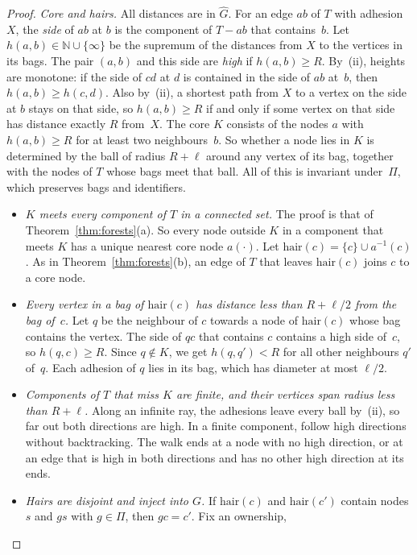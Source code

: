 \documentclass[11pt]{article}
\theoremstyle{remark}
\begin{document}
\begin{proof}
\emph{Core and hairs.} All distances are in $\hat G$. For an edge $ab$ of $T$ with adhesion $X$, the
\emph{side} of $ab$ at $b$ is the component of $T-ab$ that contains~$b$. Let $h(a,b)\in\mathbb
N\cup\{\infty\}$ be the supremum of the distances from $X$ to the vertices in its bags. The pair
$(a,b)$ and this side are \emph{high} if $h(a,b)\ge R$. By~(ii), heights are monotone: if the side of
$cd$ at $d$ is contained in the side of $ab$ at~$b$, then $h(a,b)\ge h(c,d)$. Also by~(ii), a shortest
path from $X$ to a vertex on the side at $b$ stays on that side, so $h(a,b)\ge R$ if and only if some
vertex on that side has distance exactly $R$ from~$X$. The core $K$ consists of the nodes $a$ with
$h(a,b)\ge R$ for at least two neighbours~$b$. So whether a node lies in $K$ is determined by the ball
of radius $R+\ell$ around any vertex of its bag, together with the nodes of $T$ whose bags meet that
ball. All of this is invariant under~$\Pi$, which preserves bags and identifiers.
\begin{itemize}
\item[(a)] \emph{$K$ meets every component of $T$ in a connected set.} The proof is that of
  Theorem~\ref{thm:forests}(a). So every node outside $K$ in a component that meets $K$ has a unique
  nearest core node $a(\cdot)$. Let $\mathrm{hair}(c)=\{c\}\cup a^{-1}(c)$. As in
  Theorem~\ref{thm:forests}(b), an edge of $T$ that leaves $\mathrm{hair}(c)$ joins $c$ to a core
  node.
\item[(b)] \emph{Every vertex in a bag of $\mathrm{hair}(c)$ has distance less than $R+\ell/2$ from
  the bag of~$c$.} Let $q$ be the neighbour of $c$ towards a node of $\mathrm{hair}(c)$ whose bag
  contains the vertex. The side of $qc$ that contains $c$ contains a high side of~$c$, so
  $h(q,c)\ge R$. Since $q\notin K$, we get $h(q,q')<R$ for all other neighbours $q'$ of~$q$. Each
  adhesion of $q$ lies in its bag, which has diameter at most $\ell/2$.
\item[(c)] \emph{Components of $T$ that miss $K$ are finite, and their vertices span radius less than
  $R+\ell$.} Along an infinite ray, the adhesions leave every ball by~(ii), so far out both directions
  are high. In a finite component, follow high directions without backtracking. The walk ends at a
  node with no high direction, or at an edge that is high in both directions and has no other high
  direction at its ends.
\item[(d)] \emph{Hairs are disjoint and inject into $G$.} If $\mathrm{hair}(c)$ and
  $\mathrm{hair}(c')$ contain nodes $s$ and $gs$ with $g\in\Pi$, then $gc=c'$. Fix an ownership,

\end{itemize}
\end{proof}
\end{document}
